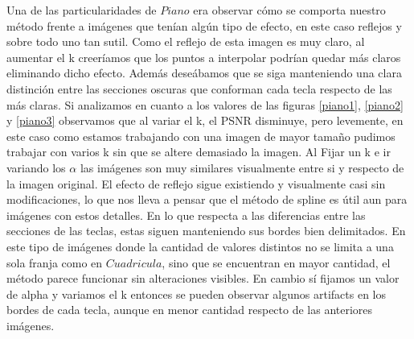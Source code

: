 \documentclass[a4paper]{article}
\begin{document}
Una de las particularidades de $Piano$ era observar cómo se comporta nuestro método frente a imágenes que tenían algún tipo de efecto, en este caso reflejos y sobre todo uno tan sutil. Como el reflejo de esta imagen es muy claro, al aumentar el k creeríamos que los puntos a interpolar podrían quedar más claros eliminando dicho efecto. Además deseábamos que se siga manteniendo una clara distinción entre las secciones oscuras que conforman cada tecla respecto de las más claras.
 Si analizamos en cuanto a los valores de las figuras \ref{piano1}, \ref{piano2} y \ref{piano3} observamos que al variar el k, el PSNR disminuye, pero levemente, en este caso como estamos trabajando con una imagen de mayor tamaño pudimos trabajar con varios k sin que se altere demasiado la imagen. Al Fijar un k e ir variando los $\alpha$ las imágenes son muy similares visualmente entre si y respecto de la imagen original. El efecto de reflejo sigue existiendo y visualmente casi sin modificaciones, lo que nos lleva a pensar que el método de spline es útil aun para imágenes con estos detalles. En lo que respecta a las diferencias entre las secciones de las teclas, estas siguen manteniendo sus bordes bien delimitados. 
En este tipo de imágenes donde la cantidad de valores distintos no se limita a una sola franja como en $Cuadricula$, sino que se encuentran en mayor cantidad, el método parece funcionar sin alteraciones visibles. En cambio sí fijamos un valor de alpha y variamos el k entonces se pueden observar algunos artifacts en los bordes de cada tecla, aunque en menor cantidad respecto de las anteriores imágenes. 
\end{document}
